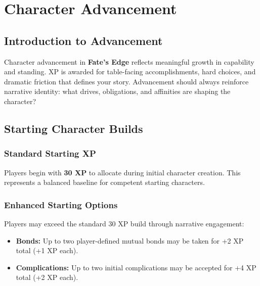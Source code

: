 \chapter{Character Advancement}
\label{chap:character-advancement}

\section{Introduction to Advancement}
\label{sec:advancement-intro}

Character advancement in \textbf{Fate's Edge} reflects meaningful growth in capability and standing. XP is awarded for table-facing accomplishments, hard choices, and dramatic friction that defines your story. Advancement should always reinforce narrative identity: what drives, obligations, and affinities are shaping the character? 

\section{Starting Character Builds}
\label{sec:starting-builds}

\subsection{Standard Starting XP}
\label{subsec:standard-starting}

Players begin with \textbf{30 XP} to allocate during initial character creation. This represents a balanced baseline for competent starting characters.

\subsection{Enhanced Starting Options}
\label{subsec:enhanced-starting}

Players may exceed the standard 30 XP build through narrative engagement:
\begin{itemize}
\item \textbf{Bonds:} Up to two player-defined mutual bonds may be taken for +2 XP total (+1 XP each).
\item \textbf{Complications:} Up to two initial complications may be accepted for +4 XP total (+2 XP each).
\end{itemize}

